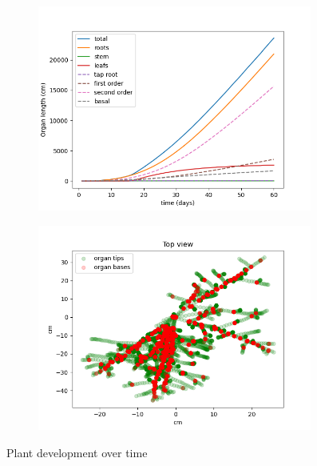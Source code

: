 \begin{figure}
\begin{subfigure}[c]{0.5\textwidth}
\includegraphics[width=0.99\textwidth]{examples/results/topics_development.png}
 \label{fig:topics_development}
\end{subfigure}
\begin{subfigure}[c]{0.5\textwidth}
\includegraphics[width=0.99\textwidth]{examples/results/topics_development2.png}
 \label{fig:topics_development2}
\end{subfigure}
\caption{Plant development over time} 
\end{figure}


